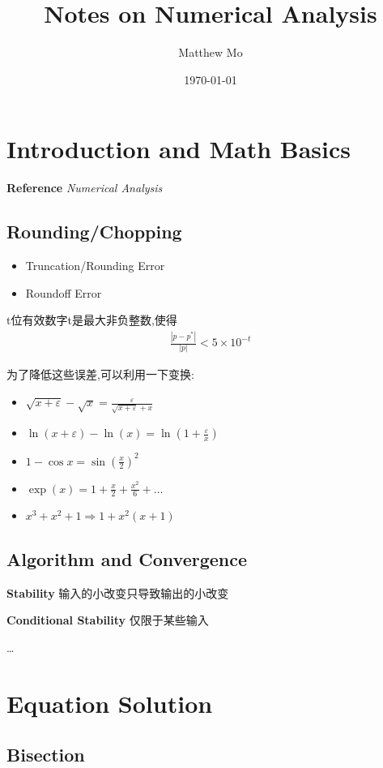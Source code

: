 \documentclass{article}
\title{\textbf{Notes on Numerical Analysis}}
\author{Matthew Mo}
\date{\today}
\begin{document}
\maketitle
\section{Introduction and Math Basics}

\textbf{Reference} \textit{Numerical Analysis}

\subsection{Rounding/Chopping}
\begin{itemize}
    \item Truncation/Rounding Error
    \item Roundoff Error
\end{itemize}

t位有效数字\tRarr t是最大非负整数,使得
\begin{align}
    \frac{|p-p^*|}{|p|}<5\times 10^{-t}
\end{align}

为了降低这些误差,可以利用一下变换:
\begin{itemize}
    \item $\sqrt{x+\varepsilon}-\sqrt{x}=\frac{\varepsilon}{\sqrt{x+\varepsilon}+x}$
    \item $\ln(x+\varepsilon)-\ln(x)=\ln(1+\frac{\varepsilon}{x})$
    \item $1-\cos x=\sin(\frac{x}{2})^2$
    \item $\exp(x)=1+\frac{x}{2}+\frac{x^2}{6}+\dots$
    \item $x^3+x^2+1\Rightarrow 1+x^2(x+1)$
\end{itemize}

\subsection{Algorithm and Convergence}

\textbf{Stability} 输入的小改变只导致输出的小改变

\textbf{Conditional Stability} 仅限于某些输入

\dots %

\section{Equation Solution}

\subsection{Bisection}
\end{document}
